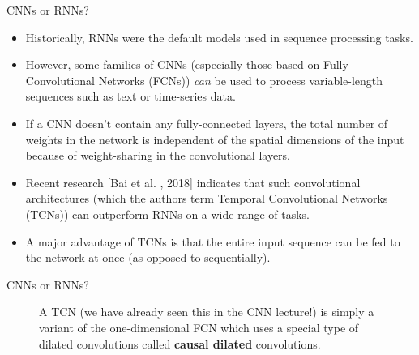 \begin{frame} {CNNs or RNNs?}
  \begin{itemize}
    \item Historically, RNNs were the default models used in sequence processing tasks.
    \item However, some families of CNNs (especially those based on Fully Convolutional Networks (FCNs)) \textit{can} be used to process variable-length sequences such as text or time-series data.
    \item If a CNN doesn't contain any fully-connected layers, the total number of weights in the network is independent of the spatial dimensions of the input because of weight-sharing in the convolutional layers.
    \item Recent research [Bai et al. , 2018] indicates that such convolutional architectures (which the authors term Temporal Convolutional Networks (TCNs)) can outperform RNNs on a wide range of tasks.
    \item A major advantage of TCNs is that the entire input sequence can be fed to the network at once (as opposed to sequentially).
  \end{itemize}
\end{frame}

\begin{frame} {CNNs or RNNs?}
  \begin{figure}
      \centering
      \caption{\footnotesize{A TCN (we have already seen this in the CNN lecture!) is simply a variant of the one-dimensional FCN which uses a special type of dilated convolutions called \textbf{causal dilated} convolutions.}}
  \end{figure}
\end{frame}


